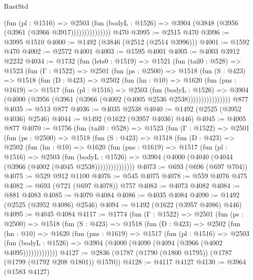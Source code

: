 \begin{lexlean}{RustStd}
\begin{coremodule}
                      (fun (pl : @1516) =>
                      @2503
                        (fun (bodyL : @1526) =>
                        @3904 (@3848 (@3956 (@3961 (@3966 @3917)))))))))))))))
    @470
@3995 := @2515 @470
@3996 := @3995 @1510
@4000 := @1492 (@3846 (@2512 (@2514 @3996)))
@4001 := @1592 @470
@4002 := @2572 @4001
@4003 := @1595 @4001
@4005 := @4003 @3912 @2232
@4034 := @1732
    (fun (lets0 : @1519) =>
    @1521
      (fun (tail0 : @528) =>
      @1523
        (fun (Γ : @1522) =>
        @2501
          (fun (ps : @2500) =>
          @1518
            (fun (S : @423) =>
            @1518
              (fun (D : @423) =>
              @2502
                (fun (hn : @10) =>
                @1620
                  (fun (pns : @1619) =>
                  @1517
                    (fun (pl : @1516) =>
                    @2503
                      (fun (bodyL : @1526) =>
                      @3904 (@4000 (@3956 (@3961 (@3966 (@4002 (@4005 @2536 @2538))))))))))))))))
    @877
@4035 := @513 @877
@4036 := @4035 @2538
@4040 := @1492 (@2525 (@3952 @4036) @2546)
@4044 := @1492 (@1622 (@3957 @4036) @446)
@4045 := @4005 @877
@4070 := @1756
    (fun (tail0 : @528) =>
    @1523
      (fun (Γ : @1522) =>
      @2501
        (fun (ps : @2500) =>
        @1518
          (fun (S : @423) =>
          @1518
            (fun (D : @423) =>
            @2502
              (fun (hn : @10) =>
              @1620
                (fun (pns : @1619) =>
                @1517
                  (fun (pl : @1516) =>
                  @2503
                    (fun (bodyL : @1526) =>
                    @3904 (@4000 (@4040 (@4044 (@3966 (@4002 (@4045 @2538)))))))))))))))
@4073 := @693 (@696 (@697 @704))
@4075 := @529 @912 @1100
@4076 := @545 @4075
@4078 := @559 @4076 @475
@4082 := @693 (@721 (@697 @4078)) @757
@4083 := @4073 @4082
@4084 := @881 @4083
@4085 := @4070 @4084
@4086 := @4035 @4084
@4090 := @1492 (@2525 (@3952 @4086) @2546)
@4094 := @1492 (@1622 (@3957 @4086) @446)
@4095 := @4045 @4084
@4117 := @1774
    (fun (Γ : @1522) =>
    @2501
      (fun (ps : @2500) =>
      @1518
        (fun (S : @423) =>
        @1518
          (fun (D : @423) =>
          @2502
            (fun (hn : @10) =>
            @1620
              (fun (pns : @1619) =>
              @1517
                (fun (pl : @1516) =>
                @2503
                  (fun (bodyL : @1526) =>
                  @3904 (@4000 (@4090 (@4094 (@3966 (@4002 @4095)))))))))))))
@4127 := @2836 (@1787 (@1790 (@1800 @1795)) (@1787 (@1799 (@1792 @208 @1801)) @1570))
@4128 := @4117 @4127
@4130 := @3964 (@1583 @4127)

\end{coremodule}
\end{lexlean}
